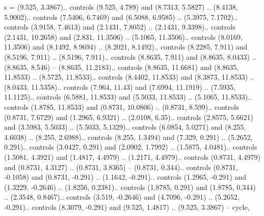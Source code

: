 {s} = {(9.525, 3.3867).. controls (9.525, 4.789) and (8.7313, 5.5827) .. (8.4138, 5.9002).. controls (7.5406, 6.7469) and (6.5088, 6.9585) .. (5.3975, 7.1702).. controls (3.9158, 7.4613) and (2.1431, 7.8052) .. (2.1431, 9.3398).. controls (2.1431, 10.2658) and (2.831, 11.3506) .. (5.1065, 11.3506).. controls (8.0169, 11.3506) and (8.1492, 8.9694) .. (8.2021, 8.1492).. controls (8.2285, 7.911) and (8.5196, 7.911) .. (8.5196, 7.911).. controls (8.8635, 7.911) and (8.8635, 8.0433) .. (8.8635, 8.546) -- (8.8635, 11.2183).. controls (8.8635, 11.6681) and (8.8635, 11.8533) .. (8.5725, 11.8533).. controls (8.4402, 11.8533) and (8.3873, 11.8533) .. (8.0433, 11.5358).. controls (7.964, 11.43) and (7.6994, 11.1919) .. (7.5935, 11.1125).. controls (6.5881, 11.8533) and (5.5033, 11.8533) .. (5.1065, 11.8533).. controls (1.8785, 11.8533) and (0.8731, 10.0806) .. (0.8731, 8.599).. controls (0.8731, 7.6729) and (1.2965, 6.9321) .. (2.0108, 6.35).. controls (2.8575, 5.6621) and (3.5983, 5.5033) .. (5.5033, 5.1329).. controls (6.0854, 5.0271) and (8.255, 4.6038) .. (8.255, 2.6988).. controls (8.255, 1.3494) and (7.329, 0.291) .. (5.2652, 0.291).. controls (3.0427, 0.291) and (2.0902, 1.7992) .. (1.5875, 4.0481).. controls (1.5081, 4.3921) and (1.4817, 4.4979) .. (1.2171, 4.4979).. controls (0.8731, 4.4979) and (0.8731, 4.3127) .. (0.8731, 3.8365) -- (0.8731, 0.344).. controls (0.8731, -0.1058) and (0.8731, -0.291) .. (1.1642, -0.291).. controls (1.2965, -0.291) and (1.3229, -0.2646) .. (1.8256, 0.2381).. controls (1.8785, 0.291) and (1.8785, 0.344) .. (2.3548, 0.8467).. controls (3.519, -0.2646) and (4.7096, -0.291) .. (5.2652, -0.291).. controls (8.3079, -0.291) and (9.525, 1.4817) .. (9.525, 3.3867) -- cycle},
